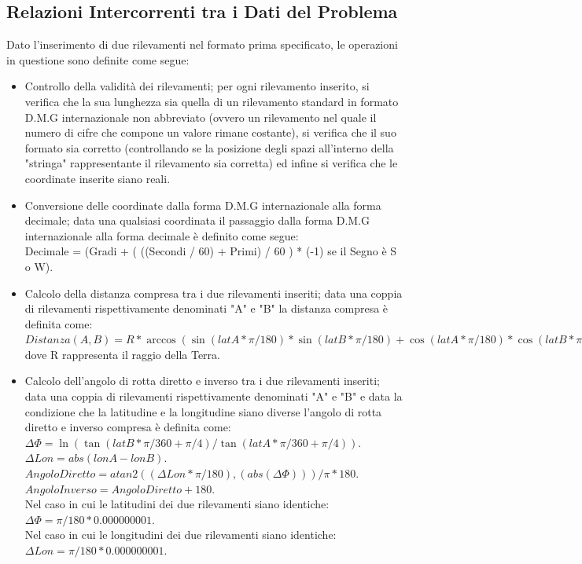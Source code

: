 \documentclass{article}
\begin{document}
\subsection{Relazioni Intercorrenti tra i Dati del Problema}
Dato l'inserimento di due rilevamenti nel formato prima specificato, le operazioni in questione sono definite come segue:
\begin{itemize}
	\item Controllo della validità dei rilevamenti; per ogni rilevamento inserito, si verifica che la sua lunghezza sia quella di un rilevamento standard in formato D.M.G internazionale non abbreviato (ovvero un rilevamento nel quale il numero di cifre che compone un valore rimane costante), si verifica che il suo formato sia corretto (controllando se la posizione degli spazi all'interno della "stringa" rappresentante il rilevamento sia corretta) ed infine si verifica che le coordinate inserite siano reali. 
	
	\item Conversione delle coordinate dalla forma D.M.G internazionale alla forma decimale; data una qualsiasi coordinata il passaggio dalla forma D.M.G internazionale alla forma decimale è definito come segue: \\
	Decimale = (Gradi + ( ((Secondi / 60) + Primi) / 60 ) * (-1) se il Segno è  S o W).
	
	\item Calcolo della distanza compresa tra i due rilevamenti inseriti;  data una coppia di rilevamenti rispettivamente denominati "A" e "B" la distanza compresa è definita come: \\
	$Distanza(A, B) = R * \arccos(\sin(latA * \pi / 180) * \sin(latB * \pi / 180) + \cos(latA * \pi / 180) * \cos(latB * \pi / 180) * \cos((lonA - lonB) * \pi / 180)). $\\
	dove R rappresenta il raggio della Terra.
	
	\item Calcolo dell'angolo di rotta diretto e inverso tra i due rilevamenti inseriti; data una coppia di rilevamenti rispettivamente denominati "A" e "B" e data la condizione che la latitudine e la longitudine siano diverse l'angolo di rotta diretto e inverso compresa è definita come: \\
	$\Delta\Phi = \ln( \tan(latB * \pi / 360 + \pi / 4 ) / \tan(latA * \pi / 360 + \pi / 4 )). $\\
	$ \Delta Lon = abs(lonA - lonB). $ \\
	$ Angolo Diretto = atan2((\Delta Lon * \pi / 180), (abs(\Delta\Phi))) / \pi * 180.$\\
	$ Angolo Inverso = Angolo Diretto+ 180.$\\
	Nel caso in cui le latitudini dei due rilevamenti siano identiche:\\
	$\Delta\Phi = \pi / 180 * 0.000000001.$\\
	Nel caso in cui le longitudini dei due rilevamenti siano identiche:\\
	$\Delta Lon = \pi / 180 * 0.000000001.$\\
\end{itemize}
\newpage
\end{document}
